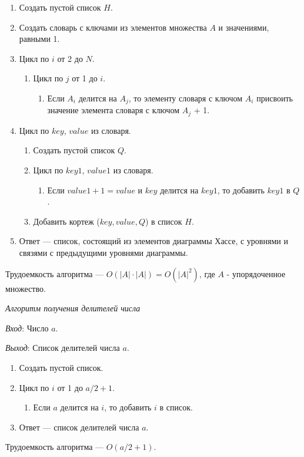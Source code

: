 \documentclass[bachelor, och, labwork]{shiza}
\begin{document}
\begin{enumerate}
    \item Создать пустой список $H$.
    \item Создать словарь с ключами из элементов множества $A$ и значениями, равными 1.
    \item Цикл по $i$ от 2 до $N$.
        \begin{enumerate}
            \item Цикл по $j$ от 1 до $i$.
                \begin{enumerate}
                    \item Если $A_i$ делится на $A_j$, то элементу словаря
                    с ключом $A_i$ присвоить значение элемента словаря с ключом
                    $A_j$ + 1.
                \end{enumerate}
        \end{enumerate}
    \item Цикл по $key$, $value$ из словаря.
        \begin{enumerate}
        \item Создать пустой список $Q$.
        \item  Цикл по $key1$, $value1$ из словаря.
            \begin{enumerate}
                \item Если $value1 + 1 = value$ и $key$ делится на $key1$, то
                добавить $key1$ в $Q$. 
            \end{enumerate}    
        \item Добавить кортеж ($key,value,Q$) в список $H$.
        \end{enumerate}
    \item Ответ --- список, состоящий из элементов диаграммы Хассе, с уровнями 
    и связями с предыдущими уровнями диаграммы.
\end{enumerate}
Трудоемкость алгоритма --- $O(|A|\cdot|A|) = O(|A|^2)$, где $A$ - упорядоченное множество.

\begin{center}\textit{Алгоритм получения делителей числа}\end{center}

\textit{Вход}: Число $a$.

\textit{Выход}: Список делителей числа $a$.
\begin{enumerate}
    \item Создать пустой список.
    \item Цикл по $i$ от 1 до $a/2+1$.
        \begin{enumerate}
            \item Если $a$ делится на $i$, то добавить $i$ в список.
        \end{enumerate}
    \item Ответ --- список делителей числа $a$.
\end{enumerate}
Трудоемкость алгоритма --- $O(a/2+1)$.
\end{document}
